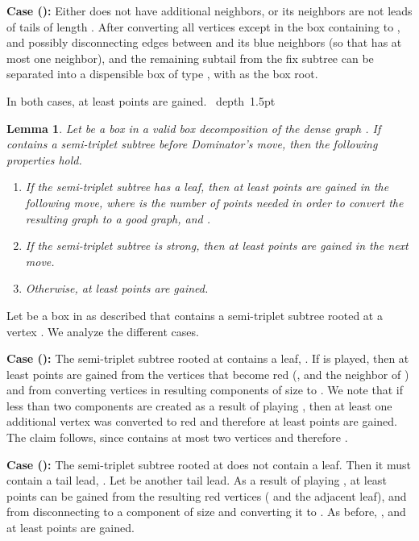 \documentclass[11pt]{article}
\def\Proof{\par\noindent{\bf Proof:~}}
\def\blackslug{\hbox{\hskip 1pt \vrule width 4pt height 8pt
    depth 1.5pt \hskip 1pt}}
\def\QED{\quad\blackslug\lower 8.5pt\null\par}
\def\dnsitem{\vspace{-7pt}\item}
\newtheorem{lemma}[theorem]{Lemma}
\theoremstyle{definition}
\begin{document}
\smallskip
\par\noindent
{\bf Case ():}
Either  does not have additional neighbors, or its neighbors are not leads of tails of length .
After converting all  vertices except  in the box containing  to , and possibly disconnecting edges between  and its blue neighbors (so that  has at most one neighbor), 
 and the remaining subtail from the fix subtree can be separated into a dispensible box of type , with  as the box root.

\smallskip
\par\noindent
In both cases, at least  points are gained.
\QED

\begin{lemma}
\label{lemma:semi_triplet_subtree_gain}
Let  be a box in a valid box decomposition of the dense graph .
If  contains a semi-triplet subtree before Dominator's move, then the following properties hold.
\begin{enumerate}
	\dnsitem If the semi-triplet subtree has a  leaf, then at least  points are gained in the following move,
	where  is the number of points needed in order to convert the resulting graph to a good graph, and .
	\dnsitem If the semi-triplet subtree is strong, then at least  points are gained in the next move.
	\dnsitem Otherwise, at least  points are gained.
\end{enumerate}
\end{lemma}
\Proof
Let  be a box in  as described that contains a semi-triplet subtree rooted at a vertex .
We analyze the different cases.
\smallskip
\par\noindent
{\bf Case ():}
The semi-triplet subtree rooted at  contains a  leaf, .
If  is played, then at least  points are gained from the vertices that become red (,  and the neighbor of ) and from converting  vertices in resulting components of size  to . We note that if less than two  components are created as a result of playing , then at least one additional vertex was converted to red and therefore at least  points are gained.
The claim follows, since  contains at most two  vertices and therefore . 

\smallskip
\par\noindent
{\bf Case ():}
The semi-triplet subtree rooted at  does not contain a  leaf.
Then it must contain a  tail lead, . 
Let  be another tail lead. As a result of playing , at least  points can be gained from the resulting red vertices ( and the adjacent leaf), and from disconnecting  to a component of size  and converting it to . 
As before, , and at least  points are gained.
\end{document}
